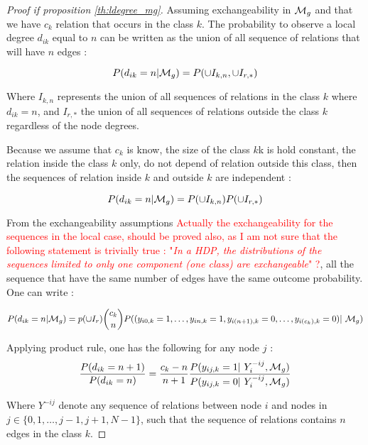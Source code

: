 \begin{proof}[Proof if proposition \ref{th:ldegree_mg}]
    Assuming exchangeability in $\mathcal{M}_g$ and that we have $c_k$ relation that occurs in the
    class $k$. The probability to observe a local degree $d_{ik}$ equal to $n$ can be written as the
    union of all sequence of relations that will have $n$ edges :

\begin{equation}
    P(d_{ik}=n | \mathcal{M}_g) = P( \cup I_{k,n}, \cup I_{r,*})
\end{equation}

Where $I_{k,n}$ represents the union of all sequences of relations in the class $k$ where
    $d_{ik} = n$, and  $I_{r,*}$ the union of all sequences of relations outside the class
    $k$ regardless of the node degrees. 

Because we assume that $c_k$ is know, the size of the class $k$k is hold constant, the
    relation inside the class $k$ only, do not depend of relation outside this class, then
    the sequences of relation inside $k$ and outside $k$ are independent : 

    \begin{equation}
        P(d_{ik}=n | \mathcal{M}_g) = P( \cup I_{k,n}) P( \cup I_{r,*})
    \end{equation}
    
    From the exchangeability assumptions \textcolor{red}{Actually the exchangeability for
    the sequences in the local case, should be proved also, as I am not sure that the
    following statement is trivially true : "\emph{In a HDP, the distributions of the
    sequences limited to only one component (one class) are exchangeable}" ?}, all the
    sequence that have the same number of edges have the same outcome probability. One can
    write : 

\begin{equation}
P(d_{ik}=n | \mg) = p(\cup I_r) \dbinom{c_k}{n} P( (y_{i0, k}=1,\dotsc,  y_{in, k}=1,
    y_{i(n+1), k}=0,\dotsc,y_{i(c_k), k}=0) | \mg)
\end{equation}

Applying product rule, one has the following for any node $j$ : 
\begin{equation} \label{eq:bb1}
    \frac{P(d_{ik} = n+1)}{P(d_{ik} = n)} = \frac{c_k - n}{n+1} \frac{P(y_{ij,k}=1
    | Y_i^{-ij}, \mg)}{P(y_{ij,k}=0 | Y_i^{-ij}, \mg)}
\end{equation}

Where $Y^{-ij}$ denote any sequence of relations between node $i$ and nodes  in $j \in \{0,1,\dotsc,j-1, j+1, N-1\}$,
such that the sequence of relations contains $n$ edges in the class $k$.


\end{proof}
